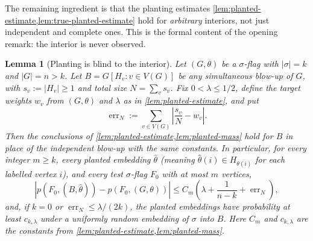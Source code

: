 \documentclass[11pt]{article}
\newtheorem{lemma}[lemma]{Lemma}
\theoremstyle{definition}
\begin{document}
The remaining ingredient is that the planting estimates
\cref{lem:planted-estimate,lem:true-planted-estimate} hold for \emph{arbitrary} interiors,
not just independent and complete ones.  This is the formal content of the opening remark:
the interior is never observed.

\begin{lemma}[Planting is blind to the interior]\label{lem:general-planting-estimate}
Let $(G,\theta)$ be a $\sigma$-flag with $|\sigma|=k$ and $|G|=n>k$.  Let
$B=G[H_v:v\in V(G)]$ be any simultaneous blow-up of $G$, with
$s_v:=|H_v|\ge1$ and total size $N=\sum_v s_v$.  Fix $0<\lambda\le1/2$, define the target
weights $w_v$ from $(G,\theta)$ and $\lambda$ as in \cref{lem:planted-estimate}, and put
\[
  \operatorname{err}_N:=\sum_{v\in V(G)}\left|\frac{s_v}{N}-w_v\right|.
\]
Then the conclusions of \cref{lem:planted-estimate,lem:planted-mass} hold for $B$ in
place of the independent blow-up with the same constants.  In particular, for every
integer $m\ge k$, every planted embedding
$\widehat\theta$ (meaning $\widehat\theta(i)\in H_{\theta(i)}$ for each labelled
vertex $i$), and every test $\sigma$-flag $F_0$ with at most $m$ vertices,
\[
  \left|p(F_0,(B,\widehat\theta))-p(F_0,(G,\theta))\right|
  \le
  C_m\left(\lambda+\frac1{n-k}+\operatorname{err}_N\right),
\]
and, if $k=0$ or $\operatorname{err}_N\le\lambda/(2k)$, the planted embeddings have
probability at least $c_{k,\lambda}$ under a uniformly random embedding of
$\sigma$ into $B$.  Here $C_m$ and $c_{k,\lambda}$ are the constants from
\cref{lem:planted-estimate,lem:planted-mass}.
\end{lemma}
\end{document}
